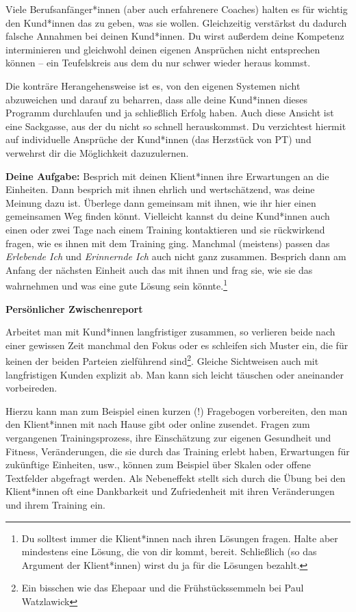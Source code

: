\documentclass[
  letterpaper,
  DIV=11,
  numbers=noendperiod]{scrreprt}
\begin{document}
Viele Berufsanfänger*innen (aber auch erfahrenere Coaches) halten es für
wichtig den Kund*innen das zu geben, was sie wollen. Gleichzeitig
verstärkst du dadurch falsche Annahmen bei deinen Kund*innen. Du wirst
außerdem deine Kompetenz interminieren und gleichwohl deinen eigenen
Ansprüchen nicht entsprechen können -- ein Teufelskreis aus dem du nur
schwer wieder heraus kommst.

Die konträre Herangehensweise ist es, von den eigenen Systemen nicht
abzuweichen und darauf zu beharren, dass alle deine Kund*innen dieses
Programm durchlaufen und ja schließlich Erfolg haben. Auch diese Ansicht
ist eine Sackgasse, aus der du nicht so schnell herauskommst. Du
verzichtest hiermit auf individuelle Ansprüche der Kund*innen (das
Herzstück von PT) und verwehrst dir die Möglichkeit dazuzulernen.

\textbf{Deine Aufgabe:} Besprich mit deinen Klient*innen ihre
Erwartungen an die Einheiten. Dann besprich mit ihnen ehrlich und
wertschätzend, was deine Meinung dazu ist. Überlege dann gemeinsam mit
ihnen, wie ihr hier einen gemeinsamen Weg finden könnt. Vielleicht
kannst du deine Kund*innen auch einen oder zwei Tage nach einem Training
kontaktieren und sie rückwirkend fragen, wie es ihnen mit dem Training
ging. Manchmal (meistens) passen das \emph{Erlebende Ich} und
\emph{Erinnernde Ich} auch nicht ganz zusammen. Besprich dann am Anfang
der nächsten Einheit auch das mit ihnen und frag sie, wie sie das
wahrnehmen und was eine gute Lösung sein könnte.\footnote{Du solltest
  immer die Klient*innen nach ihren Lösungen fragen. Halte aber
  mindestens eine Lösung, die von dir kommt, bereit. Schließlich (so das
  Argument der Klient*innen) wirst du ja für die Lösungen bezahlt.}

\textbf{Persönlicher Zwischenreport}

Arbeitet man mit Kund*innen langfristiger zusammen, so verlieren beide
nach einer gewissen Zeit manchmal den Fokus oder es schleifen sich
Muster ein, die für keinen der beiden Parteien zielführend
sind\footnote{Ein bisschen wie das Ehepaar und die Frühstückssemmeln bei
  Paul Watzlawick}. Gleiche Sichtweisen auch mit langfristigen Kunden
explizit ab. Man kann sich leicht täuschen oder aneinander vorbeireden.

Hierzu kann man zum Beispiel einen kurzen (!) Fragebogen vorbereiten,
den man den Klient*innen mit nach Hause gibt oder online zusendet.
Fragen zum vergangenen Trainingsprozess, ihre Einschätzung zur eigenen
Gesundheit und Fitness, Veränderungen, die sie durch das Training erlebt
haben, Erwartungen für zukünftige Einheiten, usw., können zum Beispiel
über Skalen oder offene Textfelder abgefragt werden. Als Nebeneffekt
stellt sich durch die Übung bei den Klient*innen oft eine Dankbarkeit
und Zufriedenheit mit ihren Veränderungen und ihrem Training ein.
\end{document}
